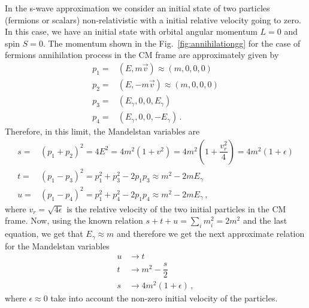 In the s-wave approximation we consider an initial state of two particles (fermions or scalars) non-relativistic with a initial relative velocity going to zero. In this case, we have an initial state with orbital angular momentum $L=0$ and spin $S=0$. The momentum shown in the Fig.~\eqref{fig:annihilationgg} for the case of fermions annihilation process in the CM frame are approximately given by
\begin{align}
p_{1}=&(E,m\vec{v})\approx(m,0,0,0)\nonumber\\
p_{2}=&(E,-m\vec{v})\approx(m,0,0,0)\nonumber\\
p_{3}=&(E_{\gamma},0,0,E_{\gamma})\nonumber\\
p_{4}=&(E_{\gamma},0,0,-E_{\gamma})\,.
\end{align}
%
Therefore, in this limit, the Mandelstan variables are
\begin{align*}
s=&(p_1+p_2)^2=4E^2=4m^2(1+v^2)=4m^2\left(1+\dfrac{v_r^2}{4}\right)=4m^2(1+\epsilon)\\
t=&(p_1-p_3)^2=p_1^2+p_3^2-2p_1p_3\approx m^2-2mE_{\gamma}\\
u=&(p_1-p_4)^2=p_1^2+p_4^2-2p_1p_4\approx m^2-2mE_{\gamma}\,,
\end{align*}
where $v_r=\sqrt{4\epsilon}$ is the relative velocity of the two initial particles in the CM frame.
Now, using the known relation $s+t+u=\sum_im_i^2=2m^2$ and the last equation, we get that $E_{\gamma}\approx m$ and therefore we get the next approximate relation for the Mandelstan variables
\begin{align}
u&\rightarrow t \nonumber\\
t&\rightarrow m^2-\dfrac{s}{2} \nonumber\\
s&\rightarrow 4m^2(1+\epsilon)\,,
\end{align}
where $\epsilon\approx 0$ take into account the non-zero initial velocity of the particles.



